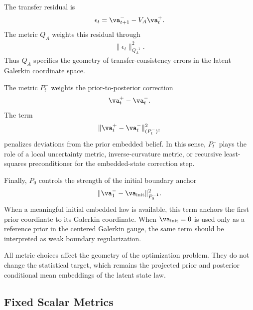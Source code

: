 \documentclass[twoside,11pt]{article}
\begin{document}
The transfer residual is
\begin{align}
\epsilon_t
=
\va_{t+1}^- - V_A\va_t^+.
\label{eq:app_transfer_residual}
\end{align}
The metric $Q_A$ weights this residual through
\begin{align}
\|\epsilon_t\|_{Q_A^{-1}}^2.
\end{align}
Thus $Q_A$ specifies the geometry of transfer-consistency errors in the
latent Galerkin coordinate space.

The metric $P_t^-$ weights the prior-to-posterior correction
\begin{align}
\va_t^+ - \va_t^-.
\end{align}
The term
\begin{align}
\|\va_t^+ - \va_t^-\|_{(P_t^-)^\dagger}^2
\end{align}
penalizes deviations from the prior embedded belief. In this sense,
$P_t^-$ plays the role of a local uncertainty metric, inverse-curvature
metric, or recursive least-squares preconditioner for the embedded-state
correction step.

Finally, $P_0$ controls the strength of the initial boundary anchor
\begin{align}
\|\va_1^- - \va_{\mathrm{init}}\|_{P_0^{-1}}^2.
\end{align}
When a meaningful initial embedded law is available, this term anchors
the first prior coordinate to its Galerkin coordinate. When
$\va_{\mathrm{init}}=0$ is used only as a reference prior in the
centered Galerkin gauge, the same term should be interpreted as weak
boundary regularization.

All metric choices affect the geometry of the optimization problem.
They do not change the statistical target, which remains the projected
prior and posterior conditional mean embeddings of the latent state law.

\subsection{Fixed Scalar Metrics}
\end{document}
